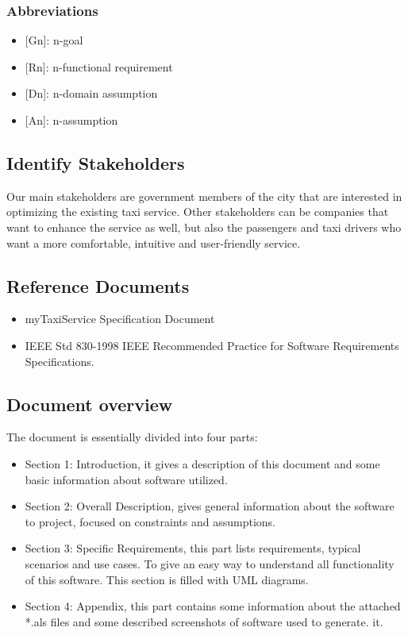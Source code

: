 \documentclass[a4paper,12pt]{article}%
\begin{document}
\subsubsection{Abbreviations}
\begin{itemize}
\item {[}Gn{]}: n-goal %
\item {[}Rn{]}: n-functional requirement
\item {[}Dn{]}: n-domain assumption
\item {[}An{]}: n-assumption
\end{itemize}
\subsection{Identify Stakeholders}
Our main stakeholders are government members of the city that are interested in optimizing the existing taxi service.
Other stakeholders can be companies that want to enhance the service as well, but also the passengers and taxi drivers who want a more comfortable, intuitive and user-friendly service.
\subsection{Reference Documents}
\begin{itemize}
\item myTaxiService Specification Document
\item IEEE Std 830-1998 IEEE Recommended Practice for Software 
Requirements Specifications.
\end{itemize}
\subsection{Document overview}
The document is essentially divided into four parts:
\begin{itemize}
\item Section 1: Introduction, it gives a description of this document and some basic information about software utilized.
\item Section 2: Overall Description, gives general information about the software to project, focused on constraints and assumptions.
\item Section 3: Specific Requirements, this part lists requirements, typical scenarios and use cases. To give an easy way to understand all functionality
of this software. This section is filled with UML diagrams.
\item Section 4: Appendix, this part contains some information about the attached *.als files and some described screenshots of software used to generate.
it.
\end{itemize}
\newpage
\end{document}
